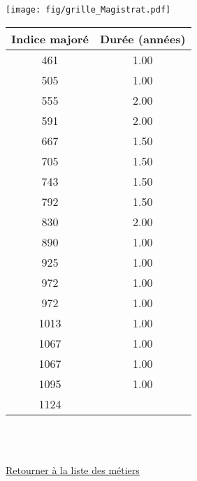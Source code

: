 \begin{minipage}{0.55\linewidth}\texttt{[image: fig/grille\_Magistrat.pdf]}\end{minipage} 
\begin{minipage}{0.3\linewidth} 
 \begin{center} 

\begin{tabular}[htb]{|c|c|} 
\hline 
 Indice majoré &  Durée (années) \\ 
\hline \hline 
 461 &  1.00 \\ 
\hline 
 505 &  1.00 \\ 
\hline 
 555 &  2.00 \\ 
\hline 
 591 &  2.00 \\ 
\hline 
 667 &  1.50 \\ 
\hline 
 705 &  1.50 \\ 
\hline 
 743 &  1.50 \\ 
\hline 
 792 &  1.50 \\ 
\hline 
 830 &  2.00 \\ 
\hline 
 890 &  1.00 \\ 
\hline 
 925 &  1.00 \\ 
\hline 
 972 &  1.00 \\ 
\hline 
 972 &  1.00 \\ 
\hline 
 1013 &  1.00 \\ 
\hline 
 1067 &  1.00 \\ 
\hline 
 1067 &  1.00 \\ 
\hline 
 1095 &  1.00 \\ 
\hline 
 1124 &   \\ 
\hline 
\hline 
\end{tabular} 
\end{center} 
 \end{minipage} 

~\\ 
 


   
 \localtableofcontents 

~\\ 
 
 \hyperlink{page.2}{\noindent Retourner à la liste des métiers}

